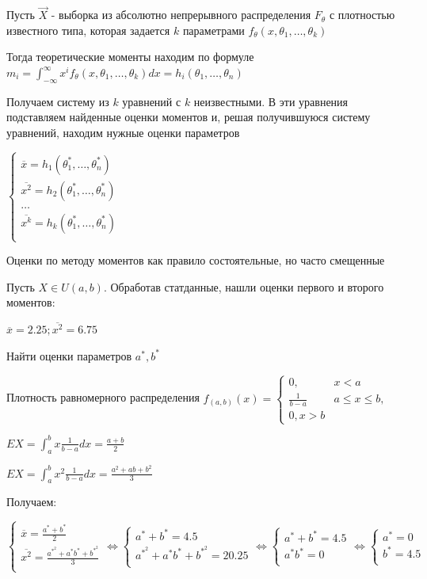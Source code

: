 \documentclass[12pt]{article}
\begin{document}
Пусть $\vec{X}$ - выборка из абсолютно непрерывного распределения $F_\theta$ с плотностью известного типа, 
которая задается $k$ параметрами $f_\theta (x, \theta_1, \dots, \theta_k)$

Тогда теоретические моменты находим по формуле $m_i = \int_{-\infty}^{\infty} x^i f_\theta (x, \theta_1, \dots, \theta_k) dx = h_i(\theta_1, \dots, \theta_n)$

Получаем систему из $k$ уравнений с $k$ неизвестными. В эти уравнения подставляем найденные оценки
моментов и, решая получившуюся систему уравнений, находим нужные оценки параметров

$\begin{cases}
    \overline{x} = h_1(\theta_1^*, \dots, \theta_n^*) \\ 
    \overline{x^2} = h_2(\theta_1^*, \dots, \theta_n^*) \\ 
    \dots \\
    \overline{x^k} = h_k(\theta_1^*, \dots, \theta_n^*) \\ 
\end{cases}$

\Nota Оценки по методу моментов как правило состоятельные, но часто смещенные

\Ex Пусть $X \in U(a, b)$. Обработав статданные, нашли оценки первого и второго моментов:

$\overline{x} = 2.25; \overline{x^2} = 6.75$

Найти оценки параметров $a^*, b^*$

Плотность равномерного распределения $f_{(a, b)} (x) = \begin{cases}0, & x < a \\ \frac{1}{b - a} & a \leq x \leq b, \\ 0, x > b\end{cases}$

$EX = \int_a^b x \frac{1}{b - a} dx = \frac{a + b}{2}$

$EX = \int_a^b x^2 \frac{1}{b - a} dx = \frac{a^2 + ab + b^2}{3}$

\mediumvspace

Получаем:

$\begin{cases}
    \overline{x} = \frac{a^* + b^*}{2} \\ 
    \overline{x^2} = \frac{a^*^2 + a^* b^* + b^*^2}{3} \\ 
\end{cases} \Longleftrightarrow \begin{cases}
    a^* + b^* = 4.5 \\ 
    a^*^2 + a^* b^* + b^*^2 = 20.25 \\ 
\end{cases} \Longleftrightarrow \begin{cases}
    a^* + b^* = 4.5 \\ 
    a^* b^* = 0 \\ 
\end{cases} \Longleftrightarrow \begin{cases}
    a^* = 0 \\ 
    b^* = 4.5 \\ 
\end{cases}$
\end{document}
